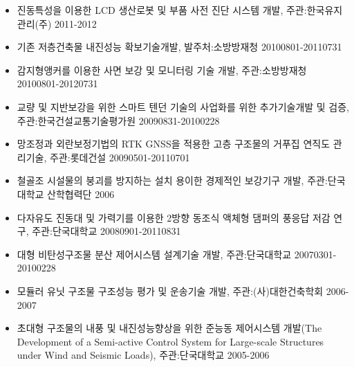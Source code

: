 \documentclass[10pt,a4paper,ragged2e]{altacv}
\begin{document}
\begin{fullwidth}
\begin{itemize}
  \item 진동특성을 이용한 LCD 생산로봇 및 부품 사전 진단 시스템 개발, 주관:한국유지관리(주) \hfill2011-2012
  \item 기존 저층건축물 내진성능 확보기술개발, 발주처:소방방재청 \hfill 20100801-20110731
  \item 감지형앵커를 이용한 사면 보강 및 모니터링 기술 개발, 주관:소방방재청 \hfill 20100801-20120731
  \item 교량 및 지반보강을 위한 스마트 텐던 기술의 사업화를 위한 추가기술개발 및 검증, 주관:한국건설교통기술평가원 \hfill 20090831-20100228
  \item 망조정과 외란보정기법의 RTK GNSS을 적용한 고층 구조물의 거푸집 연직도 관리기술, 주관:롯데건설 \hfill 20090501-20110701
  \item 철골조 시설물의 붕괴를 방지하는 설치 용이한 경제적인 보강기구 개발, 주관:단국대학교 산학협력단 \hfill2006
  \item 다자유도 진동대 및 가력기를 이용한 2방향 동조식 액체형 댐퍼의 풍응답 저감 연구, 주관:단국대학교 \hfill20080901-20110831
  \item 대형 비탄성구조물 분산 제어시스템 설계기술 개발, 주관:단국대학교 \hfill20070301-20100228
  \item 모듈러 유닛 구조물 구조성능 평가 및 운송기술 개발, 주관:(사)대한건축학회 \hfill2006-2007
  \item 초대형 구조물의 내풍 및 내진성능향상을 위한 준능동 제어시스템 개발(The Development of a Semi-active Control System for Large-scale Structures under Wind and Seismic Loads), 주관:단국대학교 \hfill2005-2006
  \end{itemize}

\end{fullwidth}
\end{document}

